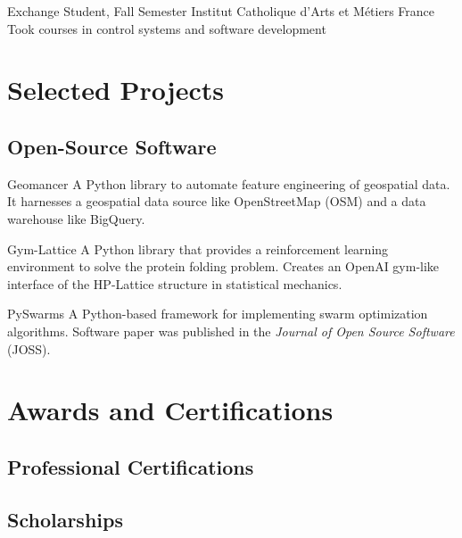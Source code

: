 \documentclass[12pt,a4paper]{moderncv}
\begin{document}
{Exchange Student, Fall Semester}
{Institut Catholique d'Arts et M\'etiers}
{France}{}
{Took courses in control systems and software development}

\section{Selected Projects}

\subsection{Open-Source Software}


{\color{blue}
    }
{Geomancer}{}{}
{
    A Python library to automate feature engineering of geospatial data. It
    harnesses a geospatial data source like OpenStreetMap (OSM) and a data
    warehouse like BigQuery.
}

{\color{blue} }
{Gym-Lattice}{}{}
{
    A Python library that provides a reinforcement learning environment
    to solve the protein folding problem. Creates an OpenAI gym-like
    interface of the HP-Lattice structure in statistical mechanics.
}

{\color{blue} }
{PySwarms}{}{}
{
    A Python-based framework for implementing swarm optimization
    algorithms. Software paper was published in the \textit{Journal of Open
        Source Software} (JOSS).
}


\section{Awards and Certifications}

\subsection{Professional Certifications}

\subsection{Scholarships}


\nocite{*}


\end{document}
